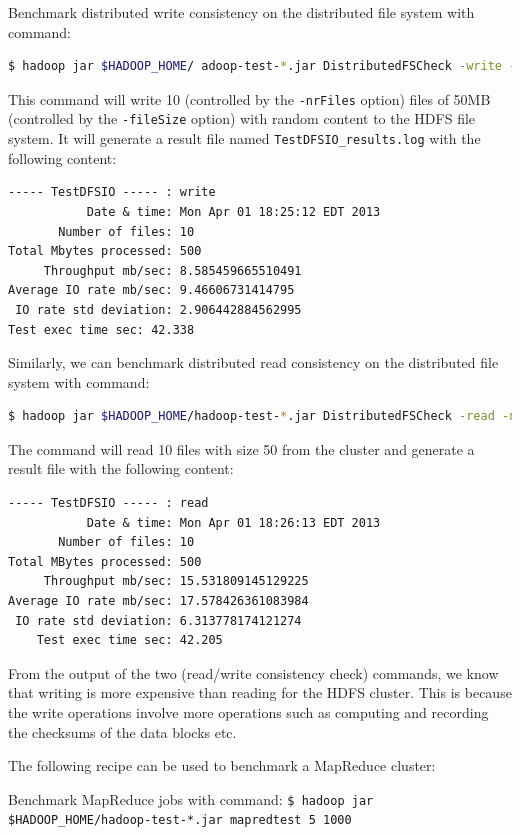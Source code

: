 Benchmark distributed write consistency on the distributed file system with command:
\lstset{style=bashstyle}
\begin{lstlisting}[language=bash]
$ hadoop jar $HADOOP_HOME/ adoop-test-*.jar DistributedFSCheck -write -nrFiles 10 -fileSize 50
\end{lstlisting}
This command will write 10 (controlled by the \verb|-nrFiles| option) files of 50MB (controlled by the \verb|-fileSize| option) with random content to the HDFS file system. It will generate a result file named \verb|TestDFSIO_results.log| with the following content:
\lstset{style=bashstyle}
\begin{lstlisting}
----- TestDFSIO ----- : write
           Date & time: Mon Apr 01 18:25:12 EDT 2013
       Number of files: 10
Total Mbytes processed: 500
     Throughput mb/sec: 8.585459665510491
Average IO rate mb/sec: 9.46606731414795
 IO rate std deviation: 2.906442884562995
Test exec time sec: 42.338
\end{lstlisting}

Similarly, we can benchmark distributed read consistency on the distributed file system with command:
\lstset{style=bashstyle}
\begin{lstlisting}[language=bash]
$ hadoop jar $HADOOP_HOME/hadoop-test-*.jar DistributedFSCheck -read -nrFiles 10 -fileSize 50
\end{lstlisting}

The command will read 10 files with size 50 from the cluster and generate a result file with the following content:
\lstset{style=bashstyle}
\begin{lstlisting}
----- TestDFSIO ----- : read
           Date & time: Mon Apr 01 18:26:13 EDT 2013
       Number of files: 10
Total MBytes processed: 500
     Throughput mb/sec: 15.531809145129225
Average IO rate mb/sec: 17.578426361083984
 IO rate std deviation: 6.313778174121274
    Test exec time sec: 42.205
\end{lstlisting}

From the output of the two (read/write consistency check) commands, we know that writing is more expensive than reading for the HDFS cluster. This is because the write operations involve more operations such as computing and recording the checksums of the data blocks etc.

The following recipe can be used to benchmark a MapReduce cluster:

Benchmark MapReduce jobs with command:
\verb|$ hadoop jar $HADOOP_HOME/hadoop-test-*.jar mapredtest 5 1000|

